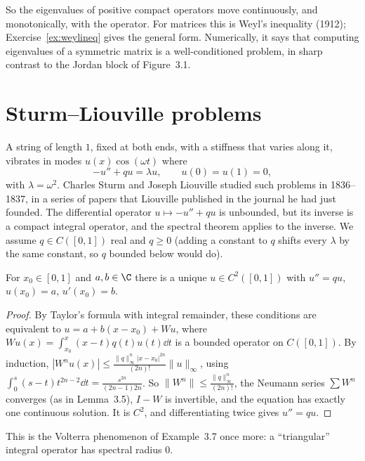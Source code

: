 So the eigenvalues of positive compact operators move continuously, and monotonically, with the operator. For matrices this is
Weyl's inequality (1912); Exercise~\ref{ex:weylineq} gives the general form. Numerically, it says that computing eigenvalues of a
symmetric matrix is a well-conditioned problem, in sharp contrast to the Jordan block of Figure~3.1.

\section{Sturm--Liouville problems}

A string of length $1$, fixed at both ends, with a stiffness that varies along it, vibrates in modes $u(x)\cos(\omega t)$ where
\begin{equation}\label{eq:sl}
-u''+qu=\lambda u,\qquad u(0)=u(1)=0,
\end{equation}
with $\lambda=\omega^2$. Charles Sturm and Joseph Liouville studied such problems in 1836--1837, in a series of papers that Liouville
published in the journal he had just founded. The differential operator $u\mapsto-u''+qu$ is unbounded, but its inverse is a compact
integral operator, and the spectral theorem applies to the inverse. We assume $q\in C([0,1])$ real and $q\ge0$ (adding a constant to $q$
shifts every $\lambda$ by the same constant, so $q$ bounded below would do).

\begin{lemma}\label{lem:ivp}
For $x_0\in[0,1]$ and $a,b\in\C$ there is a unique $u\in C^2([0,1])$ with $u''=qu$, $u(x_0)=a$, $u'(x_0)=b$.
\end{lemma}
\begin{proof}
By Taylor's formula with integral remainder, these conditions are equivalent to $u=a+b(x-x_0)+Wu$, where $Wu(x)=\int_{x_0}^x(x-t)q(t)u(t)\dd t$ is a bounded operator on $C([0,1])$. By induction,
$|W^nu(x)|\le\frac{\|q\|_\infty^n|x-x_0|^{2n}}{(2n)!}\|u\|_\infty$, using $\int_0^s(s-t)t^{2n-2}\dd t=\frac{s^{2n}}{(2n-1)2n}$. So $\|W^n\|\le\frac{\|q\|_\infty^n}{(2n)!}$, the Neumann series $\sum W^n$ converges
(as in Lemma~3.5), $I-W$ is invertible, and the equation has exactly one continuous solution. It is $C^2$, and differentiating twice gives $u''=qu$.
\end{proof}

This is the Volterra phenomenon of Example~3.7 once more: a ``triangular'' integral operator has spectral radius $0$.

